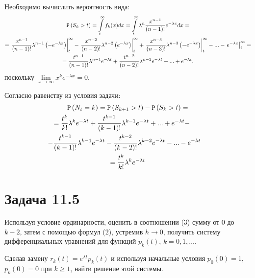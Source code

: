 \documentclass[12pt]{article}
\begin{document}
    Необходимо вычислить вероятность вида:
    \begin{multline*}
        \mathtt{P} \left ( S_k > t \right )
        = \int \limits_t^{\infty} f_k(x) dx
        = \int \limits_t^{\infty} \lambda^n \frac{x^{n-1}}{(n-1)!} e^{- \lambda x} dx = \\
        =
        \left . \frac{x^{n-1}}{(n-1)!} \lambda^{n-1} \left ( - e^{-\lambda x } \right ) \right |_t^{\infty}
        - \left . \frac{x^{n-2}}{(n-2)!} \lambda^{n-2} \left ( e^{-\lambda x } \right ) \right |_t^{\infty}
        + \left . \frac{x^{n-3}}{(n-3)!} \lambda^{n-3} \left ( - e^{-\lambda x } \right ) \right |_t^{\infty}
        - ...
        - \left . e^{-\lambda x} \right |_t^\infty = \\
        = \frac{t^{n-1}}{(n-1)!} \lambda^{n-1} e^{-\lambda t}
        + \frac{t^{n-2}}{(n-2)!} \lambda^{n-2} e^{-\lambda t}
        + ...
        + e^{-\lambda t},
    \end{multline*}
    поскольку $\lim \limits_{x \rightarrow \infty} x^k e^{- \lambda x} = 0$.

    Согласно равенству из условия задачи:
    \begin{multline*}
        \probability{N_t = k}
        = \probability{S_{k+1} > t} - \probability{S_k > t} = \\
        \shoveleft{
            = \frac{t^k}{k!} \lambda^{k} e^{-\lambda t}
            + \frac{t^{k-1}}{(k-1)!} \lambda^{k-1} e^{-\lambda t}
            + ...
            + e^{-\lambda t} - } \\
        \shoveright{
            - \frac{t^{k-1}}{(k-1)!} \lambda^{k-1} e^{-\lambda t}
            - \frac{t^{k-2}}{(k-2)!} \lambda^{k-2} e^{-\lambda t}
            - ...
            - e^{-\lambda t} } \\
        = \frac{t^k}{k!} \lambda^{k} e^{-\lambda t}
    \end{multline*}


    \section*{Задача 11.5}
    Используя условие ординарности, оценить в соотношении (3) сумму от 0 до $k-2$, затем с помощью формул (2), устремив $h \rightarrow 0$, получить систему дифференциальных уравнений для
    функций $p_k(t)$, $k=0,1, \dots$.

    Сделав замену $r_k(t) = e^{\lambda t} p_k(t)$ и используя начальные условия $p_0(0)=1$, $p_k(0)=0$ при $k \ge 1$, найти решение этой системы.
\end{document}
